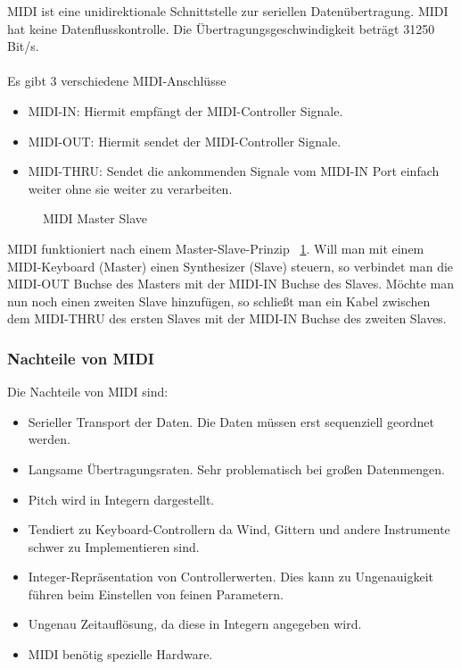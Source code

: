 \documentclass[a4paper, 12pt]{article}
\begin{document}
MIDI ist eine unidirektionale Schnittstelle zur seriellen Datenübertragung. MIDI hat keine Datenflusskontrolle. Die Übertragungsgeschwindigkeit beträgt 31250 Bit/s. \cite{MIDI} \\
\\
Es gibt 3 verschiedene MIDI-Anschlüsse
\begin{itemize}
  \item MIDI-IN: Hiermit empfängt der MIDI-Controller Signale.
  \item MIDI-OUT: Hiermit sendet der MIDI-Controller Signale.
  \item MIDI-THRU: Sendet die ankommenden Signale vom MIDI-IN Port einfach weiter ohne sie weiter zu verarbeiten.
\end{itemize}
 \begin{figure}[htbp]
  \centering
  \caption[MIDI Master Slave \cite{MMS}]{MIDI Master Slave}
  \label{fig:mms}
\end{figure}
MIDI funktioniert nach einem Master-Slave-Prinzip ~\ref{fig:mms}.
Will man mit einem MIDI-Keyboard (Master) einen Synthesizer (Slave) steuern, so verbindet man die MIDI-OUT Buchse des Masters mit der MIDI-IN Buchse des Slaves. Möchte man nun noch einen zweiten Slave hinzufügen, so schließt man ein Kabel zwischen dem MIDI-THRU des ersten Slaves mit der MIDI-IN Buchse des zweiten Slaves.

\subsubsection{Nachteile von MIDI}
Die Nachteile von MIDI sind:
\begin{itemize}
\item Serieller Transport der Daten. Die Daten müssen erst sequenziell geordnet werden.
  \item Langsame Übertragungsraten. Sehr problematisch bei großen Datenmengen.
  \item Pitch wird in Integern dargestellt.
  \item Tendiert zu Keyboard-Controllern da Wind, Gittern und andere Instrumente schwer zu Implementieren sind.
  \item Integer-Repräsentation von Controllerwerten. Dies kann zu Ungenauigkeit führen beim Einstellen von feinen Parametern.
  \item Ungenau Zeitauflösung, da diese in Integern angegeben wird.
  \item MIDI benötig spezielle Hardware.
\end{itemize}
\end{document}
